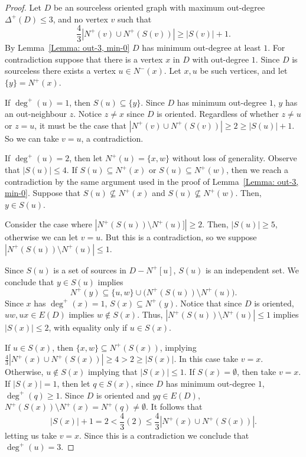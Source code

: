 \documentclass[12pt]{article}
\theoremstyle{definition}
\begin{document}
\begin{proof}
    Let $D$ be an sourceless oriented graph with maximum out-degree $\Delta^+(D)\leq 3$,
   and no vertex $v$ such that 
    \[
    \frac{4}{3}|N^+(v) \cup N^+(S(v))| \geq |S(v)|+1.
    \]
    By Lemma~\ref{Lemma: out-3, min-0} $D$ has minimum out-degree at least $1$.
    For contradiction suppose that there is a vertex $x$ in $D$ with out-degree $1$.
    Since $D$ is sourceless there exists a vertex $u \in N^-(x)$.
    Let $x,u$ be such vertices, and let $\{y\} = N^+(x)$.

    If $\deg^+(u) = 1$, then $S(u) \subseteq \{y\}$.
    Since $D$ has minimum out-degree $1$, $y$ has an out-neighbour $z$.
    Notice $z \neq x$ since $D$ is oriented.
    Regardless of whether $z\neq u$ or $z = u$, it must be the case that $|N^+(v) \cup N^+(S(v))|\geq 2 \geq |S(u)|+1$.
    So we can take $v = u$, a contradiction.


    If $\deg^+(u) = 2$, 
    then let $N^+(u) = \{x,w\}$ without loss of generality.
    Observe that $|S(u)|\leq 4$.
    If $S(u) \subseteq N^+(x)$ or $S(u) \subseteq N^+(w)$, then we reach a contradiction by the same argument used in the proof of 
    Lemma~\ref{Lemma: out-3, min-0}.
    Suppose that $S(u) \not\subseteq N^+(x)$ and $S(u) \not\subseteq N^+(w)$.
    Then, $y \in S(u)$.
    
    Consider the case where $|N^+(S(u))\setminus N^+(u)]| \geq 2$.
    Then, $|S(u)|\geq 5$, otherwise we can let $v = u$.
    But this is a contradiction, so we suppose $|N^+(S(u))\setminus N^+(u)| \leq 1$.
    
    
    Since $S(u)$ is a set of sources in $D-N^+[u]$, $S(u)$ is an independent set.
    We conclude that $y \in S(u)$ implies
    \[
    N^+(y) \subseteq \{u,w\} \cup \Big(N^+(S(u))\setminus N^+(u)\Big).
    \]
    Since $x$ has $\deg^+(x) = 1$, $S(x)\subseteq N^+(y)$.
    Notice that since $D$ is oriented,  $uw, ux \in E(D)$ implies $w \notin S(x)$.
    Thus, $|N^+(S(u))\setminus N^+(u)| \leq 1$ implies $|S(x)|\leq 2$, with equality only if $u \in S(x)$.  
    
    If $u \in S(x)$, then $\{x,w\} \subseteq N^+(S(x))$, implying 
    $\frac{4}{3}|N^+(x)\cup N^+(S(x))| \geq 4 > 2\geq |S(x)|$.
    In this case take $v =x$.
    Otherwise, $u \not\in S(x)$ implying that $|S(x)|\leq 1$.
    If $S(x) = \emptyset$, then take $v = x$.
    If $|S(x)| = 1$, then let $q \in S(x)$, since $D$ has minimum out-degree $1$, $\deg^+(q)\geq 1$.
    Since $D$ is oriented and $yq \in E(D)$, $N^+(S(x))\setminus N^+(x) = N^+(q)\neq \emptyset$.
    It follows that 
    \[
    |S(x)|+1 = 2 < \frac{4}{3}(2) \leq \frac{4}{3}|N^+(x)\cup N^+(S(x))|.
    \]
    letting us take $v = x$.
    Since this is a contradiction
    we conclude that $\deg^+(u) = 3$.


\end{proof}
\end{document}
